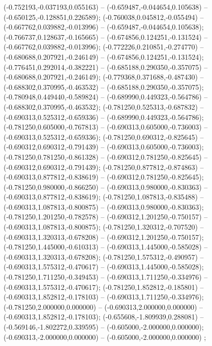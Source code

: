  (-0.752193,-0.037193,0.055163) -- (-0.659487,-0.044654,0.105638) -- (-0.650125,-0.128851,0.226589);
 (-0.760038,0.045812,-0.055494) -- (-0.667762,0.039882,-0.013996) -- (-0.659487,-0.044654,0.105638);
 (-0.766737,0.128637,-0.165665) -- (-0.674856,0.124251,-0.131524) -- (-0.667762,0.039882,-0.013996);
 (-0.772226,0.210851,-0.274770) -- (-0.680688,0.207921,-0.246149) -- (-0.674856,0.124251,-0.131524);
 (-0.776451,0.292014,-0.382221) -- (-0.685188,0.290350,-0.357075) -- (-0.680688,0.207921,-0.246149);
 (-0.779368,0.371688,-0.487430) -- (-0.688302,0.370995,-0.463532) -- (-0.685188,0.290350,-0.357075);
 (-0.780948,0.449440,-0.589824) -- (-0.689990,0.449323,-0.564786) -- (-0.688302,0.370995,-0.463532);
 (-0.781250,0.525313,-0.687832) -- (-0.690313,0.525312,-0.659336) -- (-0.689990,0.449323,-0.564786);
 (-0.781250,0.605000,-0.767813) -- (-0.690313,0.605000,-0.736003) -- (-0.690313,0.525312,-0.659336);
 (-0.781250,0.690312,-0.825645) -- (-0.690312,0.690312,-0.791439) -- (-0.690313,0.605000,-0.736003);
 (-0.781250,0.781250,-0.861328) -- (-0.690312,0.781250,-0.825645) -- (-0.690312,0.690312,-0.791439);
 (-0.781250,0.877812,-0.874863) -- (-0.690313,0.877812,-0.838619) -- (-0.690312,0.781250,-0.825645);
 (-0.781250,0.980000,-0.866250) -- (-0.690313,0.980000,-0.830363) -- (-0.690313,0.877812,-0.838619);
 (-0.781250,1.087813,-0.835488) -- (-0.690313,1.087813,-0.800875) -- (-0.690313,0.980000,-0.830363);
 (-0.781250,1.201250,-0.782578) -- (-0.690312,1.201250,-0.750157) -- (-0.690313,1.087813,-0.800875);
 (-0.781250,1.320312,-0.707520) -- (-0.690313,1.320313,-0.678208) -- (-0.690312,1.201250,-0.750157);
 (-0.781250,1.445000,-0.610313) -- (-0.690313,1.445000,-0.585028) -- (-0.690313,1.320313,-0.678208);
 (-0.781250,1.575312,-0.490957) -- (-0.690313,1.575312,-0.470617) -- (-0.690313,1.445000,-0.585028);
 (-0.781250,1.711250,-0.349453) -- (-0.690313,1.711250,-0.334976) -- (-0.690313,1.575312,-0.470617);
 (-0.781250,1.852812,-0.185801) -- (-0.690313,1.852812,-0.178103) -- (-0.690313,1.711250,-0.334976);
 (-0.781250,2.000000,0.000000) -- (-0.690313,2.000000,0.000000) -- (-0.690313,1.852812,-0.178103);
 (-0.655608,-1.809939,0.288081) -- (-0.569146,-1.802272,0.339595) -- (-0.605000,-2.000000,0.000000);
 (-0.690313,-2.000000,0.000000) -- (-0.605000,-2.000000,0.000000) ;
